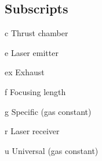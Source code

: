 \begin{multicols*}{2}
    \section*{Subscripts}
    \begin{nomlist}
        \item[c]                Thrust chamber
        \item[e]                Laser emitter
        \item[ex]               Exhaust
        \item[f]                Focusing length
        \item[g]                Specific (gas constant)
        \item[r]                Laser receiver
        \item[u]                Universal (gas constant)
    \end{nomlist}


\end{multicols*}